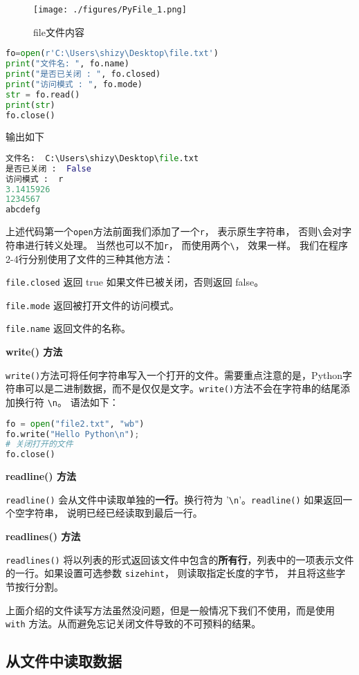 \begin{figure}[ht]\label{PyFile_fig2}
\centering
\texttt{[image: ./figures/PyFile\_1.png]}
\caption{file文件内容} \label{PyFile_fig1}
\end{figure}
\begin{lstlisting}[language=python]
fo=open(r'C:\Users\shizy\Desktop\file.txt')
print("文件名: ", fo.name)
print("是否已关闭 : ", fo.closed)
print("访问模式 : ", fo.mode)
str = fo.read()
print(str)
fo.close()
\end{lstlisting}
输出如下
\begin{lstlisting}[language=python]
文件名:  C:\Users\shizy\Desktop\file.txt
是否已关闭 :  False
访问模式 :  r
3.1415926
1234567
abcdefg
\end{lstlisting}
上述代码第一个\verb|open|方法前面我们添加了一个\verb|r|， 表示原生字符串， 否则\verb|\|会对字符串进行转义处理。 当然也可以不加\verb|r|， 而使用两个\verb|\|， 效果一样。 我们在程序2-4行分别使用了文件的三种其他方法：

\verb|file.closed| 返回 true 如果文件已被关闭，否则返回 false。

\verb|file.mode| 返回被打开文件的访问模式。

\verb|file.name| 返回文件的名称。


\textbf{write() 方法}

\verb|write()|方法可将任何字符串写入一个打开的文件。需要重点注意的是，Python字符串可以是二进制数据，而不是仅仅是文字。\verb|write()|方法不会在字符串的结尾添加换行符 \verb|\n|。 语法如下：
\begin{lstlisting}[language=python]
fo = open("file2.txt", "wb")
fo.write("Hello Python\n");
# 关闭打开的文件
fo.close()
\end{lstlisting}

\textbf{readline() 方法}

\verb|readline()| 会从文件中读取单独的\textbf{一行}。换行符为 '\verb|\n|'。\verb|readline()| 如果返回一个空字符串， 说明已经已经读取到最后一行。

\textbf{readlines() 方法}

\verb|readlines()| 将以列表的形式返回该文件中包含的\textbf{所有行}，列表中的一项表示文件的一行。如果设置可选参数 \verb|sizehint|， 则读取指定长度的字节， 并且将这些字节按行分割。

上面介绍的文件读写方法虽然没问题，但是一般情况下我们不使用，而是使用\verb|with| 方法。从而避免忘记关闭文件导致的不可预料的结果。


\subsection{从文件中读取数据}
